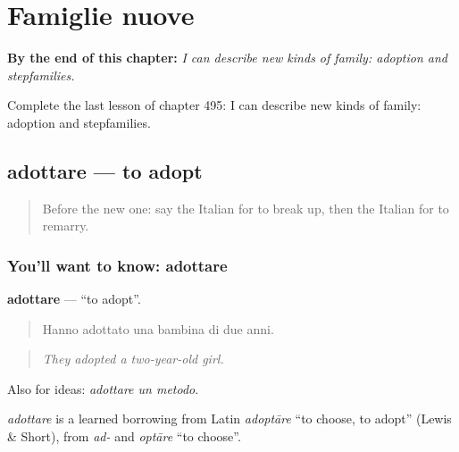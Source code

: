 
\chapter{Famiglie nuove}
\label{ch:it-famiglie-nuove}

\begin{chapteropening}
\textbf{By the end of this chapter:} \emph{I can describe new kinds of family: adoption and stepfamilies.}

Complete the last lesson of chapter 495: I can describe new kinds of family: adoption and stepfamilies.
\end{chapteropening}

\section[adottare]{adottare — to adopt}

\label{lesson:IT-C495-adottare}



\begin{quote}
Before the new one: say the Italian for to break up, then the Italian for to remarry.
\end{quote}

\subsection*{You'll want to know: adottare}
\textbf{adottare} — \textquotedblleft{}to adopt\textquotedblright{}.

\begin{quote}
Hanno adottato una bambina di due anni.
\end{quote}

\begin{quote}
\emph{They adopted a two-year-old girl.}
\end{quote}

Also for ideas: \emph{adottare un metodo}.

\begin{cousinweb}
\emph{adottare} is a learned borrowing from Latin \emph{adoptāre} \textquotedblleft{}to choose, to adopt\textquotedblright{} (Lewis \& Short), from \emph{ad-} and \emph{optāre} \textquotedblleft{}to choose\textquotedblright{}.
\end{cousinweb}

